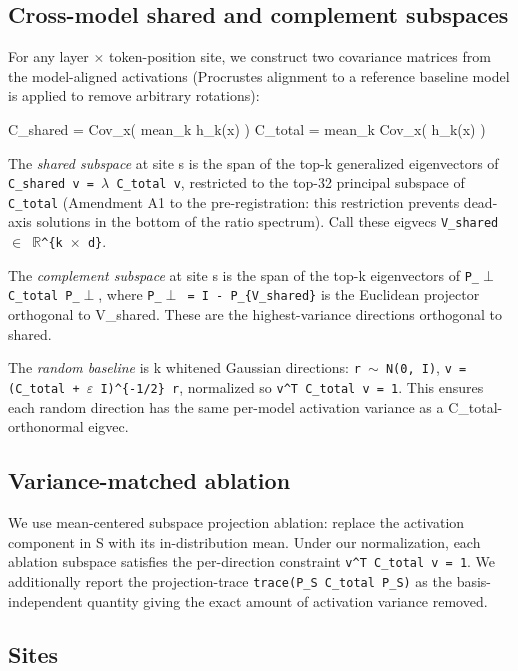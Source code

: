 \subsection{Cross-model shared and complement subspaces}

For any layer $\times$ token-position site, we construct two covariance matrices
from the model-aligned activations (Procrustes alignment to a reference
baseline model is applied to remove arbitrary rotations):

  C\_shared = Cov\_x( mean\_k h\_k(x) )
  C\_total  = mean\_k Cov\_x( h\_k(x) )

The \emph{shared subspace} at site s is the span of the top-k generalized
eigenvectors of \texttt{C\_shared v = $\lambda$ C\_total v}, restricted to the top-32
principal subspace of \texttt{C\_total} (Amendment A1 to the pre-registration:
this restriction prevents dead-axis solutions in the bottom of the ratio
spectrum). Call these eigvecs \texttt{V\_shared $\in$ $\mathbb{R}$\textasciicircum{}\{k $\times$ d\}}.

The \emph{complement subspace} at site s is the span of the top-k eigenvectors
of \texttt{P\_$\perp$ C\_total P\_$\perp$}, where \texttt{P\_$\perp$ = I - P\_\{V\_shared\}} is the Euclidean
projector orthogonal to V\_shared. These are the highest-variance
directions orthogonal to shared.

The \emph{random baseline} is k whitened Gaussian directions: \texttt{r $\sim$ N(0, I)},
\texttt{v = (C\_total + $\varepsilon$ I)\textasciicircum{}\{-1/2\} r}, normalized so \texttt{v\textasciicircum{}T C\_total v = 1}. This
ensures each random direction has the same per-model activation variance
as a C\_total-orthonormal eigvec.

\subsection{Variance-matched ablation}

We use mean-centered subspace projection ablation: replace the activation
component in S with its in-distribution mean. Under our normalization,
each ablation subspace satisfies the per-direction constraint
\texttt{v\textasciicircum{}T C\_total v = 1}. We additionally report the projection-trace
\texttt{trace(P\_S C\_total P\_S)} as the basis-independent quantity giving the
exact amount of activation variance removed.

\subsection{Sites}


